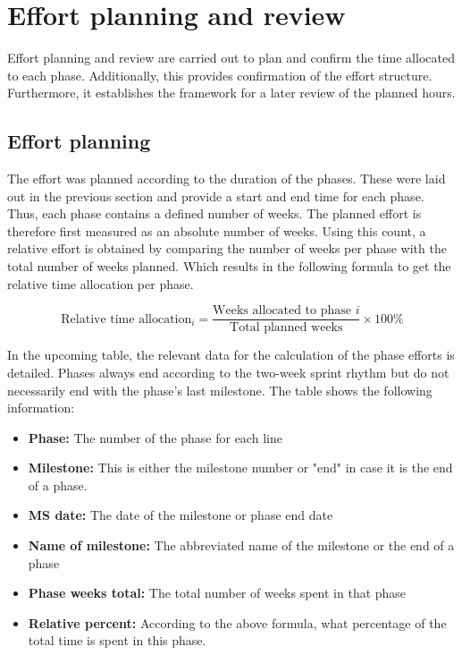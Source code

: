 

\section{Effort planning and review}

Effort planning and review are carried out to plan and confirm the time allocated to each phase. Additionally, this provides confirmation of the effort structure. Furthermore, it establishes the framework for a later review of the planned hours.



\subsection*{Effort planning}

The effort was planned according to the duration of the phases. These were laid out in the previous section and provide a start and end time for each phase. Thus, each phase contains a defined number of weeks. The planned effort is therefore first measured as an absolute number of weeks. Using this count, a relative effort is obtained by comparing the number of weeks per phase with the total number of weeks planned. Which results in the following formula to get the relative time allocation per phase. 

\[
\text{Relative time allocation}_i =
\frac{\text{Weeks allocated to phase } i}
{\text{Total planned weeks}} \times 100\%
\]



In the upcoming table, the relevant data for the calculation of the phase efforts is detailed. Phases always end according to the two-week sprint rhythm but do not necessarily end with the phase's last milestone. The table shows the following information:

\begin{itemize}
    \item \textbf{Phase:} The number of the phase for each line
    \item \textbf{Milestone:} This is either the milestone number or "end" in case it is the end of a phase.
    \item \textbf{MS date:} The date of the milestone or phase end date
    \item \textbf{Name of milestone:} The abbreviated name of the milestone or the end of a phase
    \item \textbf{Phase weeks total:} The total number of weeks spent in that phase
    \item \textbf{Relative percent:} According to the above formula, what percentage of the total time is spent in this phase.
\end{itemize}

